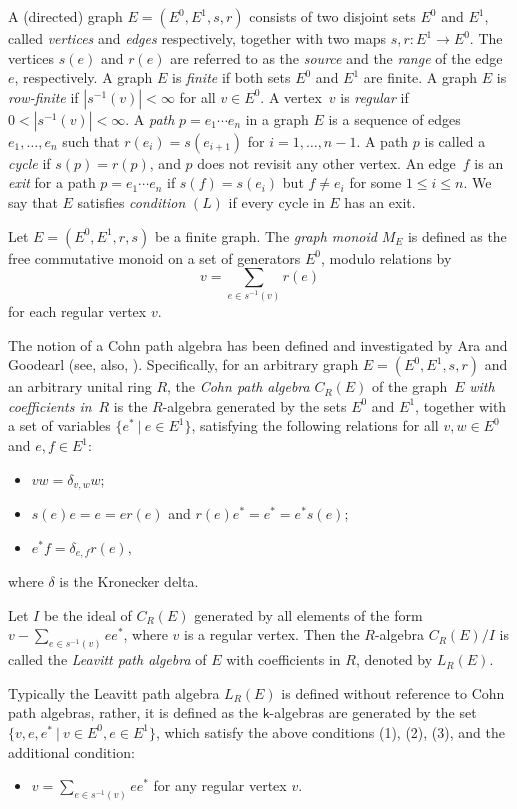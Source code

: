 \documentclass[a4paper, 11pt, reqno]{amsart}
\theoremstyle{definition}
\newcommand{\K}{\mathsf{k}}
\begin{document}
A (directed) graph $E = (E^0, E^1, s, r)$ 
consists of two disjoint sets $E^0$ and $E^1$, called \emph{vertices} and \emph{edges}
respectively, together with two maps $s, r: E^1 \longrightarrow E^0$.  The
vertices $s(e)$ and $r(e)$ are referred to as the \emph{source} and the \emph{range}
of the edge~$e$, respectively. A graph $E$ is \emph{finite} if both sets $E^0$ and $E^1$ are finite.  A graph $E$ is \emph{row-finite} if $|s^{-1}(v)| < \infty$ for all $v\in E^0$. A vertex~$v$ is \emph{regular}
if $0 < |s^{-1}(v)| < \infty$.
A \emph{path} $p = e_{1} \cdots e_{n}$ in a graph $E$ is a sequence of
edges $e_{1}, \dots, e_{n}$ such that $r(e_{i}) = s(e_{i+1})$ for $i
= 1, \dots, n-1$.  
A path $p$ is called a \emph{cycle} if $s(p) = r(p)$, and $p$ does not revisit
any other vertex. 
An edge~$f$ is an \emph{exit} for a path $p = e_{1} \cdots e_{n}$ if $s(f) = s(e_{i})$
but $f \ne e_{i}$ for some $1 \le i \le n$. We say that $E$ satisfies {\it condition} $(L)$ if every cycle in $E$ has an exit.


Let $E=(E^0,E^1,r,s)$ be a finite  graph. The {\it graph monoid} $M_E$ is defined as the free commutative monoid on a set of generators $E^0$, modulo relations by
\[ v = \sum_{e\in s^{-1}(v)} r(e)\]
for each regular vertex $v$. 

The notion of a Cohn path algebra has been defined and investigated by Ara and Goodearl \cite{AraGoodearl}
(see, also, \cite{lpabook}). Specifically, for an arbitrary graph $E = (E^0,E^1,s,r)$
and an arbitrary unital ring $R$, the \emph{Cohn path algebra} $C_{R}(E)$ of the graph~$E$
\emph{with coefficients in}~$R$ is the $R$-algebra generated
by the sets $E^0$ and $E^1$, together with a set of variables $\{e^{*}\ |\ e\in E^1\}$,
satisfying the following relations for all $v, w\in E^0$ and $e, f\in E^1$:
\begin{itemize}
\item[(1)] $v w = \delta_{v, w} w$;
\item[(2)] $s(e) e = e = e r(e)$ and
$r(e) e^* = e^* = e^*s(e)$;\item[(3)] $e^* f = \delta_{e, f} r(e)$,
\end{itemize}
where $\delta$ is the Kronecker delta. 

Let $I$ be the ideal of $C_{R}(E)$ generated by all elements of the form
$v-\sum_{e\in s^{-1}(v)}ee^*$, where $v$ is a regular vertex. Then the $R$-algebra $C_{R}(E)/I$ is called the \emph{Leavitt path algebra}
of $E$ with coefficients in $R$, denoted by $L_{R}(E)$.

Typically  the Leavitt path algebra $L_{R}(E)$ is defined without reference to Cohn
path algebras, rather, it is defined as the $\K$-algebras are generated by
the set $\{v, e, e^*\ |\ v\in E^0, e\in E^1\}$,
which satisfy the  above conditions (1), (2), (3), and the additional condition:
\begin{itemize}
\item[(4)] $v= \sum_{e\in s^{-1}(v)}ee^*$ for any  regular vertex $v$.
\end{itemize}
\medskip
\end{document}
